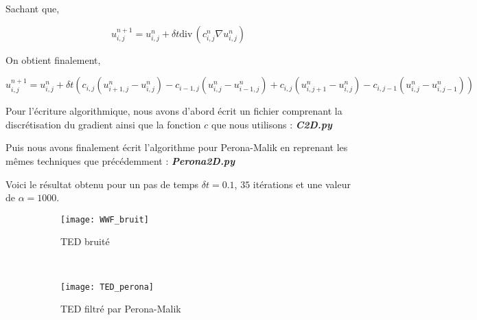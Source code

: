 \documentclass[a4paper,12pt,twoside]{report}
\newcommand{\1}{\mathbb{1}}
\renewcommand{\div}{\mathrm{div}\,}
\begin{document}
	Sachant que,	
	
	\begin{equation*}
	u_{i,j}^{n+1} = u_{i,j}^{n} + \delta t\div\left(c_{i,j}^{n}\nabla u_{i,j}^{n}\right)
	\end{equation*}
	
	On obtient finalement,
	
	\begin{equation*}
	u_{i,j}^{n+1} = u_{i,j}^{n} + \delta t \left( c_{i,j}\left(u^n_{i+1,j}-u^n_{i,j}\right)-c_{i-1,j}\left(u^n_{i,j}-u^n_{i-1,j}\right)+c_{i,j}\left(u^n_{i,j+1}-u^n_{i,j}\right)-c_{i,j-1}\left(u^n_{i,j}-u^n_{i,j-1}\right) \right)
	\end{equation*}
	
	Pour l'écriture algorithmique, nous avons d'abord écrit un fichier comprenant la discrétisation du gradient ainsi que la fonction $c$ que nous utilisons : \emph{\textbf{C2D.py}}
	
	
	Puis nous avons finalement écrit l'algorithme pour Perona-Malik en reprenant les mêmes techniques que précédemment : \emph{\textbf{Perona2D.py}}
	
	
	Voici le résultat obtenu pour un pas de temps $\delta t = 0.1$, $35$ itérations et une valeur de $\alpha = 1000$.
	
	\begin{figure}[htbp]
    \centering
    \begin{subfigure}[b]{0.45\textwidth}
        \centering \texttt{[image: WWF\_bruit]}
        \caption{TED bruité}
    \end{subfigure}
    ~
    \begin{subfigure}[b]{0.45\textwidth}
        \centering \texttt{[image: TED\_perona]}
        \caption{TED filtré par Perona-Malik}
    \end{subfigure}
    \caption{}
	\end{figure}
	
\end{document}
